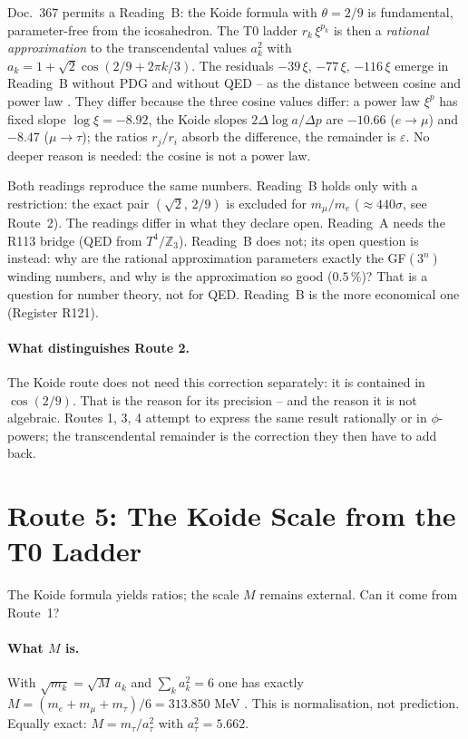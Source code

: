 Doc.~367 permits a Reading~B: the Koide formula with $\theta=2/9$ is
fundamental, parameter-free from the icosahedron. The T0 ladder $r_k\,\xi^{p_k}$
is then a \emph{rational approximation} to the transcendental values $a_k^2$
with $a_k = 1+\sqrt2\cos(2/9+2\pi k/3)$. The residuals $-39\,\xi$, $-77\,\xi$,
$-116\,\xi$ emerge in Reading~B without PDG and without QED -- as the distance
between cosine and power law \KM. They differ because the three cosine values
differ: a power law $\xi^{p}$ has fixed slope $\log\xi=-8{.}92$, the Koide slopes
$2\Delta\log a/\Delta p$ are $-10{.}66$ ($e\to\mu$) and $-8{.}47$ ($\mu\to\tau$);
the ratios $r_j/r_i$ absorb the difference, the remainder is $\varepsilon$.
No deeper reason is needed: the cosine is not a power law.

Both readings reproduce the same numbers. Reading~B holds only with a
restriction: the exact pair $(\sqrt2,\,2/9)$ is excluded for $m_\mu/m_e$
(${\approx}440\sigma$, see Route~2). The readings differ in what they declare open.
Reading~A needs the R113 bridge (QED from $T^4/\mathbb{Z}_3$). Reading~B does
not; its open question is instead: why are the rational approximation parameters
exactly the GF$(3^n)$ winding numbers, and why is the approximation so good
($0{.}5\,\%$)? That is a question for number theory, not for QED. Reading~B is
the more economical one (Register R121).

\paragraph{What distinguishes Route 2.}
The Koide route does not need this correction separately: it is contained in
$\cos(2/9)$. That is the reason for its precision -- and the reason it is not
algebraic. Routes 1, 3, 4 attempt to express the same result rationally or in
$\phi$-powers; the transcendental remainder is the correction they then have to
add back.

\section{Route 5: The Koide Scale from the T0 Ladder}

The Koide formula yields ratios; the scale $M$ remains external. Can it come
from Route~1?

\paragraph{What $M$ is.}
With $\sqrt{m_k} = \sqrt{M}\,a_k$ and $\sum_k a_k^2 = 6$ one has exactly
$M = (m_e+m_\mu+m_\tau)/6 = 313{.}850$ MeV \BM. This is normalisation, not
prediction. Equally exact: $M = m_\tau/a_\tau^2$ with $a_\tau^2 = 5{.}662$.

